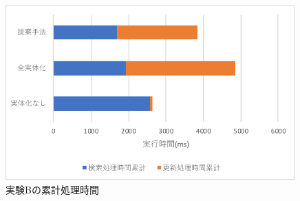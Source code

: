 \documentclass[a4paper,11pt]{ujreport}
\begin{document}
\begin{figure}[htbp]
	\begin{center}
		\includegraphics[width=30em]{src/ExperimentB-total.pdf} %
	\end{center}
	\caption{実験Bの累計処理時間}
	\label{ExperimentB-total}
\end{figure}
\end{document}
